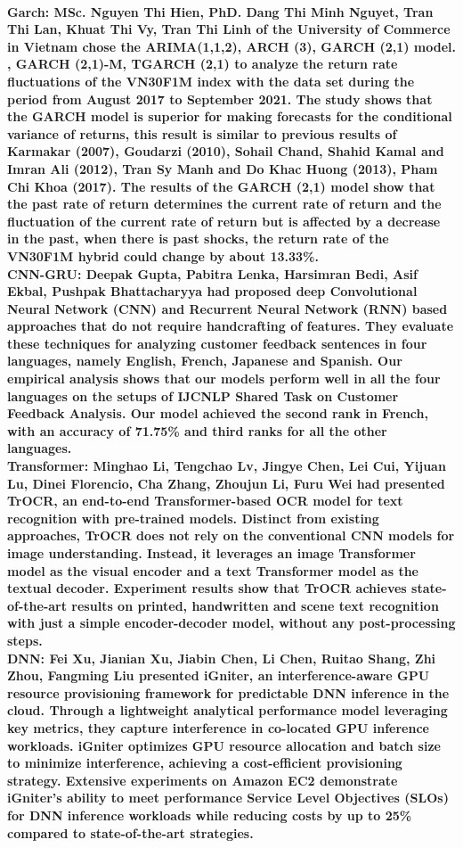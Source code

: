 \documentclass{ieeeojies}
\begin{document}
\\
\bfseries Garch:
\mdseries MSc. Nguyen Thi Hien, PhD. Dang Thi Minh Nguyet, Tran Thi Lan, Khuat Thi Vy, Tran Thi Linh of the University of Commerce in Vietnam chose the ARIMA(1,1,2), ARCH (3), GARCH (2,1) model. , GARCH (2,1)-M, TGARCH (2,1) to analyze the return rate fluctuations of the VN30F1M index with the data set during the period from August 2017 to September 2021. The study shows that the GARCH model is superior for making forecasts for the conditional variance of returns, this result is similar to previous results of Karmakar (2007), Goudarzi (2010), Sohail Chand, Shahid Kamal and Imran Ali (2012), Tran Sy Manh and Do Khac Huong (2013), Pham Chi Khoa (2017). The results of the GARCH (2,1) model show that the past rate of return determines the current rate of return and the fluctuation of the current rate of return but is affected by a decrease in the past, when there is past shocks, the return rate of the VN30F1M hybrid could change by about 13.33\%. \cite{related_garch}
\\
\bfseries CNN-GRU:
\mdseries Deepak Gupta, Pabitra Lenka, Harsimran Bedi, Asif Ekbal, Pushpak Bhattacharyya had proposed deep Convolutional Neural Network (CNN) and Recurrent Neural Network (RNN) based approaches that do not require handcrafting of features. They evaluate these techniques for analyzing customer feedback sentences in four languages, namely English, French, Japanese and Spanish. Our empirical analysis shows that our models perform well in all the four languages on the setups of IJCNLP Shared Task on Customer Feedback Analysis. Our model achieved the second rank in French, with an accuracy of 71.75\% and third ranks for all the other languages. \cite{related_cnngru}
\\
\bfseries Transformer:
\mdseries Minghao Li, Tengchao Lv, Jingye Chen, Lei Cui, Yijuan Lu, Dinei Florencio, Cha Zhang, Zhoujun Li, Furu Wei had presented TrOCR, an end-to-end Transformer-based OCR model for text recognition with pre-trained models. Distinct from existing approaches, TrOCR does not rely on the conventional CNN models for image understanding. Instead, it leverages an image Transformer model as the visual encoder and a text Transformer model as the textual decoder. Experiment results show that TrOCR achieves state-of-the-art results on printed, handwritten and scene text recognition with just a simple encoder-decoder model, without any post-processing steps. \cite{related_transformer}
\\
\bfseries DNN:
\mdseries Fei Xu, Jianian Xu, Jiabin Chen, Li Chen, Ruitao Shang, Zhi Zhou, Fangming Liu presented iGniter, an interference-aware GPU resource provisioning framework for predictable DNN inference in the cloud. Through a lightweight analytical performance model leveraging key metrics, they capture interference in co-located GPU inference workloads. iGniter optimizes GPU resource allocation and batch size to minimize interference, achieving a cost-efficient provisioning strategy. Extensive experiments on Amazon EC2 demonstrate iGniter's ability to meet performance Service Level Objectives (SLOs) for DNN inference workloads while reducing costs by up to 25\% compared to state-of-the-art strategies. \cite{related_dnn} 
\end{document}
